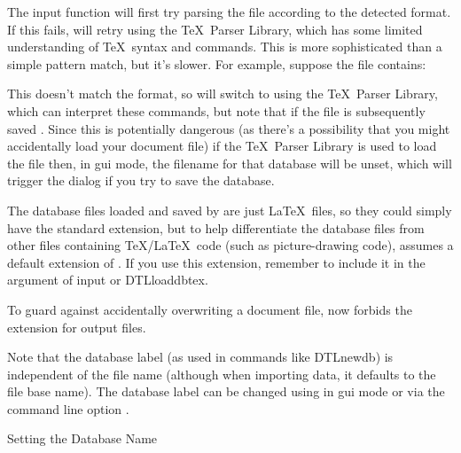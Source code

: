The  input function will first try parsing the file
according to the detected format.  If this fails, 
will retry using the \TeX\ Parser Library, which has some limited
understanding of \TeX\ syntax and  commands.
This is more sophisticated than a simple pattern match, but it's slower.
For example, suppose the file contains:

This doesn't match the  format, so  will
switch to using the \TeX\ Parser Library, which can interpret these
commands, but note that if the file is subsequently saved
. Since this is
potentially dangerous (as there's a possibility that you might
accidentally load your document  file) if the 
\TeX\ Parser Library is used to load the file then, in \gls{gui}
mode, the filename for that database will be unset, which will 
trigger the  dialog if you try to save the database.

The  database files loaded and saved by 
are just \LaTeX\ files, so they could simply have the standard
 extension, but to help differentiate the database files
from other files containing \TeX\slash \LaTeX\ code (such as picture-drawing
code),  assumes a default extension of .
If you use this extension, remember to include it in the argument of
\gls{input} or \gls{DTLloaddbtex}.

\begin{information}
To guard against accidentally overwriting a document file, 
now forbids the  extension for output files.
\end{information}

Note that the database label (as used in commands like \gls{DTLnewdb})
is independent of the file name (although when importing data, it defaults 
to the file base name).  The database label can be changed using 
 in 
\gls{gui} mode or via the command line option 
.

{
}
{Setting the Database Name}

